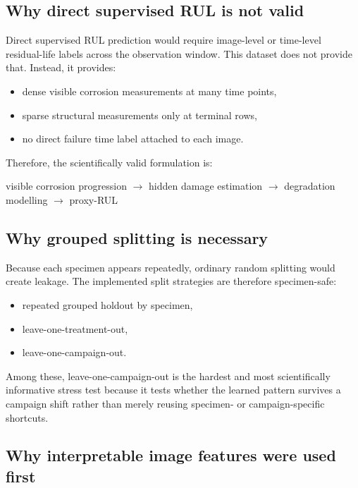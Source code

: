 \documentclass[10pt,a4paper,twocolumn]{article}
\begin{document}
\subsection{Why direct supervised RUL is not valid}

Direct supervised RUL prediction would require image-level or time-level residual-life labels across the observation window. This dataset does not provide that. Instead, it provides:

\begin{itemize}
    \item dense visible corrosion measurements at many time points,
    \item sparse structural measurements only at terminal rows,
    \item no direct failure time label attached to each image.
\end{itemize}

Therefore, the scientifically valid formulation is:

\begin{center}
visible corrosion progression $\rightarrow$ hidden damage estimation $\rightarrow$ degradation modelling $\rightarrow$ proxy-RUL
\end{center}

\subsection{Why grouped splitting is necessary}

Because each specimen appears repeatedly, ordinary random splitting would create leakage. The implemented split strategies are therefore specimen-safe:

\begin{itemize}
    \item repeated grouped holdout by specimen,
    \item leave-one-treatment-out,
    \item leave-one-campaign-out.
\end{itemize}

Among these, leave-one-campaign-out is the hardest and most scientifically informative stress test because it tests whether the learned pattern survives a campaign shift rather than merely reusing specimen- or campaign-specific shortcuts.

\subsection{Why interpretable image features were used first}
\end{document}

